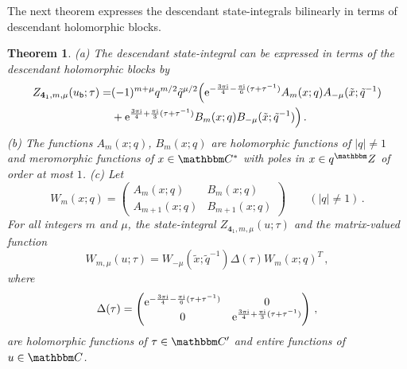 \documentclass[12pt,reqno]{amsart}
\newtheorem{theorem}{Theorem}
\theoremstyle{definition}
\def\BZ{\mathbbm Z}
\def\BC{\mathbbm C}
\def\tq{\tilde{q}}
\def\tx{\tilde{x}}
\def\ri{\mathrm{i}}
\def\tx{\tilde{x}}
\def\re{{\rm e}}
\def\ri{{\rm i}}
\def\ub{u_{\mathsf{b}}}
\def\md{\mathbf}
\newcommand{\knot}[1]{\md{#1}}
\begin{document}
The next theorem expresses the descendant state-integrals bilinearly
in terms of descendant holomorphic blocks.

\begin{theorem}
  \label{thm.41a}
  \rm{(a)} The descendant state-integral can be expressed in terms of
  the descendant holomorphic blocks by 
  \begin{align}
    Z_{\knot{4}_1,m,\mu}(\ub;\tau) 
    =& (-1)^{m+\mu}q^{m/2}\tq^{\mu/2} \Big(
    \re^{-\frac{3\pi\ri}{4} -\frac{\pi\ri}{6}(\tau+\tau^{-1})}
      A_m(x;q) A_{-\mu}(\tx;\tq^{-1}) \\ & +
    \re^{\frac{3\pi\ri}{4}+\frac{\pi\ri}{3}(\tau+\tau^{-1})}
      B_{m}(x;q) B_{-\mu}(\tx;\tq^{-1})\Big) \,.
    \label{41x-desc-fac}
  \end{align}
  \rm{(b)} The functions $A_m(x;q)$, $B_m(x;q)$ are holomorphic
  functions of $|q| \neq 1$ and meromorphic functions of $x \in \BC^*$
  with poles in $x \in q^\BZ$ of order at most $1$.  \newline
  \rm{(c)} Let
  \begin{equation}
    W_m(x;q) = \begin{pmatrix}
      A_{m}(x;q) & B_{m}(x;q)  \\
      A_{m+1}(x;q) & B_{m+1}(x;q) 
    \end{pmatrix} \qquad (|q| \neq 1) \,.
    \label{eq:Wm}
  \end{equation}
  For all integers $m$ and $\mu$, the state-integral
  $Z_{\knot{4}_1,m,\mu}(u;\tau)$ and the matrix-valued function
  \begin{equation}
    W_{m,\mu}(u;\tau) = W_{-\mu}(\tx;\tq^{-1}) \Delta(\tau) 
    W_m(x;q)^T \,,
    \label{W41x-desc}
  \end{equation}
  where
  \begin{equation}
    \label{D41}
    \Delta(\tau) = \begin{pmatrix}
      \re^{-\frac{3\pi\ri}{4}-\frac{\pi\ri}{6}(\tau+\tau^{-1})}&0\\
      0&\re^{\frac{3\pi\ri}{4}+\frac{\pi\ri}{3}(\tau+\tau^{-1})}
    \end{pmatrix} \,,
  \end{equation}
  are holomorphic functions of $\tau \in \BC'$ and entire
  functions of $u \in \BC$. 
\end{theorem}
\end{document}

